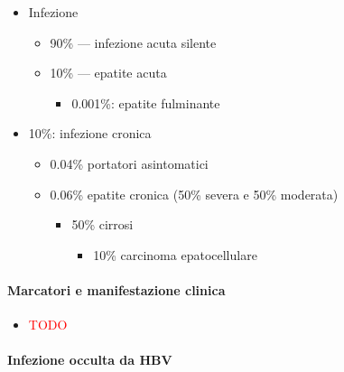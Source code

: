 \documentclass[italian,]{article}
\providecommand{\tightlist}{%
  \setlength{\itemsep}{0pt}\setlength{\parskip}{0pt}}
\newcommand{\asidefigure}[2]{\marginpar{\phantom{Img:}\newline\texttt{[image: \#1]}\\\footnotesize\emph{#2}}}
\newcommand{\TODO}[1]{\textcolor{red}{\textsf{\footnotesize{TODO #1}}}} %
\begin{document}
\begin{itemize}
\tightlist
\item
  Infezione \asidefigure{img/storia-clinica-eptite.png}{}

  \begin{itemize}
  \tightlist
  \item
    90\% --- infezione acuta silente
  \item
    10\% --- epatite acuta

    \begin{itemize}
    \tightlist
    \item
      0.001\%: epatite fulminante
    \end{itemize}
  \end{itemize}
\item
  10\%: infezione cronica

  \begin{itemize}
  \tightlist
  \item
    0.04\% portatori asintomatici
  \item
    0.06\% epatite cronica (50\% severa e 50\% moderata)

    \begin{itemize}
    \tightlist
    \item
      50\% cirrosi

      \begin{itemize}
      \tightlist
      \item
        10\% carcinoma epatocellulare
      \end{itemize}
    \end{itemize}
  \end{itemize}
\end{itemize}

\hypertarget{marcatori-e-manifestazione-clinica}{%
\paragraph{Marcatori e manifestazione
clinica}\label{marcatori-e-manifestazione-clinica}}

\begin{itemize}
\item
  \TODO{}
\end{itemize}

\hypertarget{infezione-occulta-da-hbv}{%
\paragraph{Infezione occulta da HBV}\label{infezione-occulta-da-hbv}}
\end{document}
